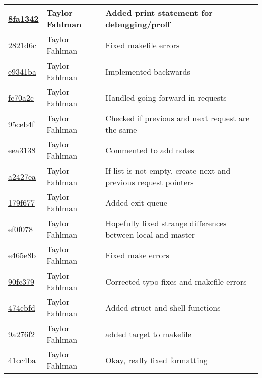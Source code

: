 \begin{tabular}{l l l}
\href{git@github.com:fahlmant/cs444/commit/8fa13421d3f213f3e1698235bd37426b314838d6}{8fa1342} & Taylor Fahlman & Added print statement for debugging/proff\\\hline
\href{git@github.com:fahlmant/cs444/commit/2821d6ce67d5d1a5051838079defe48c4f14ee9f}{2821d6c} & Taylor Fahlman & Fixed makefile errors\\\hline
\href{git@github.com:fahlmant/cs444/commit/e9341bad2ae0d815c1eddedcb0070bb99c3ae231}{e9341ba} & Taylor Fahlman & Implemented backwards\\\hline
\href{git@github.com:fahlmant/cs444/commit/fc70a2c72e4933dbf271bf6f5b4adc250cd93f0b}{fc70a2c} & Taylor Fahlman & Handled going forward in requests\\\hline
\href{git@github.com:fahlmant/cs444/commit/95ceb4f9438107951331d241099b020416a2e580}{95ceb4f} & Taylor Fahlman & Checked if previous and next request are the same\\\hline
\href{git@github.com:fahlmant/cs444/commit/eea31387ddd4b439198607910a6025a957d4ce2b}{eea3138} & Taylor Fahlman & Commented to add notes\\\hline
\href{git@github.com:fahlmant/cs444/commit/a2427eaa94cfc72c3c636d359e1ff18729c50803}{a2427ea} & Taylor Fahlman & If list is not empty, create next and previous request pointers\\\hline
\href{git@github.com:fahlmant/cs444/commit/179f677a63ce6e59233d66e1696cc2a2c6da4f94}{179f677} & Taylor Fahlman & Added exit queue\\\hline
\href{git@github.com:fahlmant/cs444/commit/ef0f078626f6b3779db8239cfadefc9b0eb57422}{ef0f078} & Taylor Fahlman & Hopefully fixed strange differences between local and master\\\hline
\href{git@github.com:fahlmant/cs444/commit/e465e8bca4a176e46eec39c9506fcbbeaa52346d}{e465e8b} & Taylor Fahlman & Fixed make errors\\\hline
\href{git@github.com:fahlmant/cs444/commit/90fe379dcec284aec20892a7b5dfed7418d1f629}{90fe379} & Taylor Fahlman & Corrected typo fixes and makefile errors\\\hline
\href{git@github.com:fahlmant/cs444/commit/474cbfd6cf240364ec4739b91d21f0a08efa0507}{474cbfd} & Taylor Fahlman & Added struct and shell functions\\\hline
\href{git@github.com:fahlmant/cs444/commit/9a276f27141dec3a008c5ff9b3f53302579d55dc}{9a276f2} & Taylor Fahlman & added target to makefile\\\hline
\href{git@github.com:fahlmant/cs444/commit/41cc4baab6306e573e7cebb13ab23eba9ee28942}{41cc4ba} & Taylor Fahlman & Okay, really fixed formatting\\\hline

\end{tabular}
